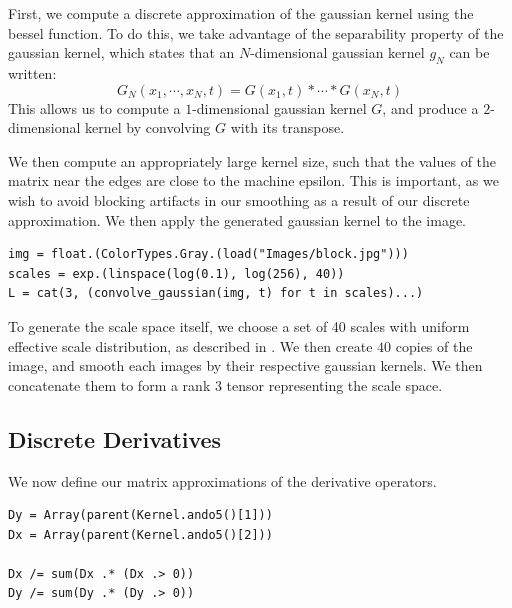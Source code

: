 \documentclass{article}
\begin{document}
First, we compute a discrete approximation of the gaussian kernel using the bessel function.
To do this, we take advantage of the separability property of the gaussian kernel, which states that an $N$-dimensional gaussian kernel $g_N$ can be written:
\[G_N(x_1, \cdots, x_N, t) = G(x_1, t) * \cdots * G(x_N, t)\]
This allows us to compute a $1$-dimensional gaussian kernel $G$, and produce a $2$-dimensional kernel by convolving $G$ with its transpose.

We then compute an appropriately large kernel size, such that the values of the matrix near the edges are close to the machine epsilon.
This is important, as we wish to avoid blocking artifacts in our smoothing as a result of our discrete approximation.
We then apply the generated gaussian kernel to the image.
\begin{lstlisting}
img = float.(ColorTypes.Gray.(load("Images/block.jpg")))
scales = exp.(linspace(log(0.1), log(256), 40))
L = cat(3, (convolve_gaussian(img, t) for t in scales)...)
\end{lstlisting}

To generate the scale space itself, we choose a set of 40 scales with uniform effective scale distribution, as described in \cite{Lindeberg1993b}.
We then create $40$ copies of the image, and smooth each images by their respective gaussian kernels.
We then concatenate them to form a rank $3$ tensor representing the scale space.

\subsection{Discrete Derivatives}
We now define our matrix approximations of the derivative operators.
\begin{lstlisting}
Dy = Array(parent(Kernel.ando5()[1]))
Dx = Array(parent(Kernel.ando5()[2]))

Dx /= sum(Dx .* (Dx .> 0))
Dy /= sum(Dy .* (Dy .> 0))
\end{lstlisting}
\end{document}
